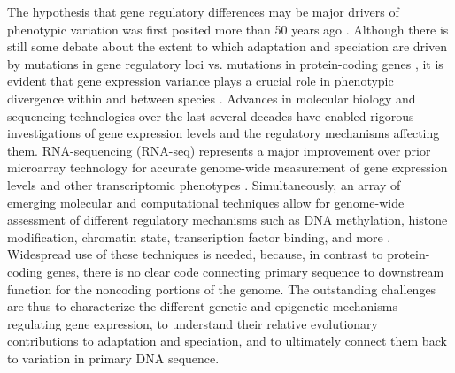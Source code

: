 {The hypothesis that gene regulatory differences may be major drivers of phenotypic variation was first posited more than 50 years ago \cite{Britten and Davidson 1969+1971}. Although there is still some debate about the extent to which adaptation and speciation are driven by mutations in gene regulatory loci vs. mutations in protein-coding genes \cite{Hoekstra and Coyne 2007, Sean B Carroll 2008}, it is evident that gene expression variance plays a crucial role in phenotypic divergence within and between species \cite{Sean B Carroll 2005, Greg Wray 2007 (evolutionary significance of cis-regulatory mutations), Gilad et al. 2006 (expression profiling in primates...), Frankel Wang and Stern 2012 (Conserved regulatory architecture...), Stern and Orgogozo 2008 (The loci of evolution...), Zheng et al. 2011 (Regulatory variation within and between species)}. Advances in molecular biology and sequencing technologies over the last several decades have enabled rigorous investigations of gene expression levels and the regulatory mechanisms affecting them. RNA-sequencing (RNA-seq) represents a major improvement over prior microarray technology for accurate genome-wide measurement of gene expression levels and other transcriptomic phenotypes  \cite{Zhao et al 2014 (Comparison of RNA-seq and Microarray...activated T cells), Mantione et al 2014 (Comparing Bioinformatic gene expression...), Wang et al. 2009 (RNA-seq: a revolutionary tool for transcriptomics), Marioni et al 2008 (RNA-seq: an assessment of technical reproducibility and comparison with gene expression arrays)}. Simultaneously, an array of emerging molecular and computational techniques allow for genome-wide assessment of different regulatory mechanisms such as DNA methylation, histone modification, chromatin state, transcription factor binding, and more \cite{Chen et al. 2017 (Epigenetic Regulation: A new frontier for biomedical engineers)}. Widespread use of these techniques is needed, because, in contrast to protein-coding genes, there is no clear code connecting primary sequence to downstream function for the noncoding portions of the genome. The outstanding challenges are thus to characterize the different genetic and epigenetic mechanisms regulating gene expression, to understand their relative evolutionary contributions to adaptation and speciation, and to ultimately connect them back to variation in primary DNA sequence.

}

